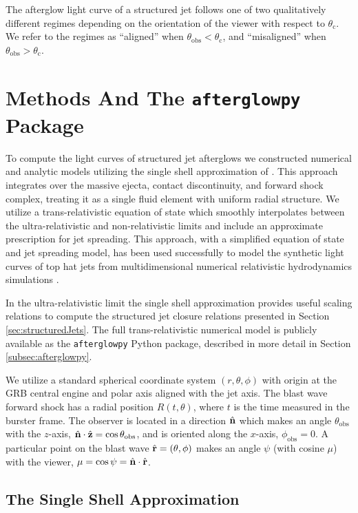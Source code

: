 \documentclass[twocolumn]{aastex62}
\newcommand{\afterglowpy}{{\tt afterglowpy}}
\newcommand{\thobs}{\ensuremath{\theta_{\mathrm{obs}}}}
\newcommand{\phobs}{\ensuremath{\phi_{\mathrm{obs}}}}
\newcommand{\thC}{\ensuremath{\theta_{\mathrm{c}}}}
\begin{document}
The afterglow light curve of a structured jet follows one of two qualitatively different regimes depending on the orientation of the viewer with respect to $\thC$.  We refer to the regimes as ``aligned'' when $\thobs < \thC$, and ``misaligned'' when $\thobs > \thC$.  


\section{Methods And The \afterglowpy{} Package}\label{sec:numerical}

To compute the light curves of structured jet afterglows we constructed numerical and analytic models utilizing the single shell approximation of \cite{van-Eerten:2010aa, van-Eerten:2018ab}.  This approach integrates over the massive ejecta, contact discontinuity, and forward shock complex, treating it as a single fluid element with uniform radial structure. We utilize a trans-relativistic equation of state which smoothly interpolates between the ultra-relativistic and non-relativistic limits and include an approximate prescription for jet spreading.  This approach, with a simplified equation of state and jet spreading model, has been used successfully to model the synthetic light curves of top hat jets from multidimensional numerical relativistic hydrodynamics simulations \citep{van-Eerten:2010aa}.

In the ultra-relativistic limit the single shell approximation provides useful scaling relations to compute the structured jet closure relations presented in Section \ref{sec:structuredJets}.  The full trans-relativistic numerical model is publicly available as the \afterglowpy{} Python package, described in more detail in Section \ref{subsec:afterglowpy}.

We utilize a standard spherical coordinate system $(r, \theta, \phi)$ with origin at the GRB central engine and polar axis aligned with the jet axis.  The blast wave forward shock has a radial position $R(t, \theta)$, where $t$ is the time measured in the burster frame. The observer is located in a direction $\hat{\bf n}$ which makes an angle $\thobs$ with the $z$-axis, $\hat{\bf n} \cdot \hat{\bf z} = \cos \thobs$, and is oriented along the $x$-axis, $\phobs = 0$.  A particular point on the blast wave $\hat{\bf r} = (\theta, \phi)$ makes an angle $\psi$ (with cosine $\mu$) with the viewer, $\mu = \cos \psi = \hat{\bf n} \cdot \hat{\bf r}$.

\subsection{The Single Shell Approximation}\label{subsec:algo}
\end{document}

